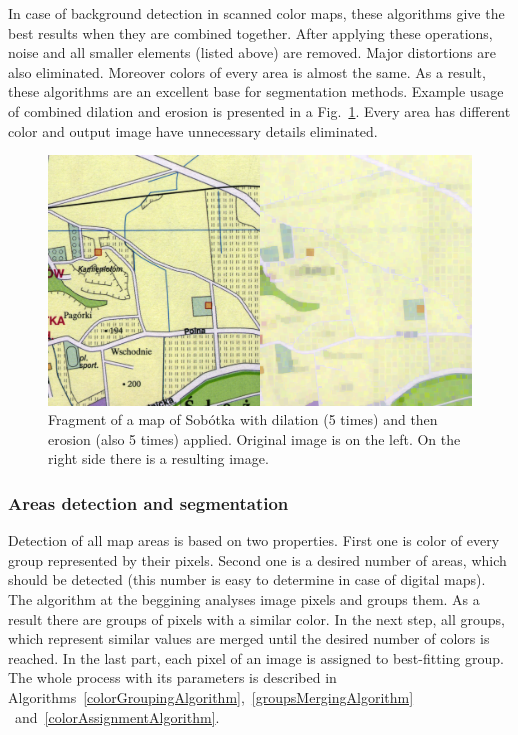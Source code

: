 \documentclass[a4paper,onecolumn,oneside,12pt]{memoir}
\begin{document}
In case of background detection in scanned color maps, these algorithms give the best results when
they are combined together. After applying these operations, noise and all smaller elements (listed
above) are removed. Major distortions are also eliminated. Moreover colors of every area is almost
the same. As a result, these algorithms are an excellent base for segmentation methods. Example
usage of combined dilation and erosion is presented in a Fig.~\ref{dilationErosionResult}. Every
area has different color and output image have unnecessary details eliminated.

\begin{figure}[!ht]
\begin{center}
\includegraphics[scale=1.0]{images/dilationErosionResult.png}
\caption{Fragment of a map of Sobótka with dilation (5 times) and then erosion (also 5 times) applied.
Original image is on the left. On the right side there is a resulting image.}
\label{dilationErosionResult}
\end{center}
\end{figure}

\subsubsection{Areas detection and segmentation}

Detection of all map areas is based on two properties. First one is color of every group represented
by their pixels. Second one is a desired number of areas, which should be detected (this number is
easy to determine in case of digital maps). The algorithm at the beggining analyses image pixels and
groups them. As a result there are groups of pixels with a similar color. In the next step,
all groups, which represent similar values are merged until the desired number of colors is reached.
In the last part, each pixel of an image is assigned to best-fitting group. The whole process with
its parameters is described in Algorithms~\ref{colorGroupingAlgorithm},~\ref{groupsMergingAlgorithm}
~and~\ref{colorAssignmentAlgorithm}. \\
\end{document}
